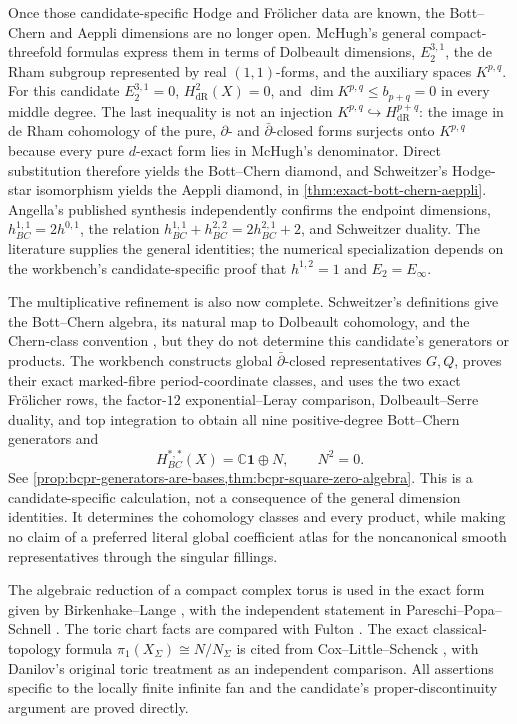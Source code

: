 Once those candidate-specific Hodge and Fr\"olicher data are known, the
Bott--Chern and Aeppli dimensions are no longer open.  McHugh's general
compact-threefold formulas
\cite[Theorem~6.3, Proposition~6.4, equation~(7), and \S7.1]{McHugh2019}
express them in terms
of Dolbeault dimensions, $E_2^{3,1}$, the de Rham subgroup represented by
real $(1,1)$-forms, and the auxiliary spaces $K^{p,q}$.  For this candidate
$E_2^{3,1}=0$, $H^2_{\mathrm{dR}}(X)=0$, and
$\dim K^{p,q}\le b_{p+q}=0$ in every middle degree.  The last inequality is
not an injection $K^{p,q}\hookrightarrow H^{p+q}_{\mathrm{dR}}$: the image in
de Rham cohomology of the pure, $\partial$- and $\bar\partial$-closed forms
surjects onto $K^{p,q}$ because every pure $d$-exact form lies in McHugh's
denominator.  Direct substitution therefore yields the Bott--Chern diamond,
and Schweitzer's Hodge-star isomorphism
\cite[\S2.c, pp.~9--10]{Schweitzer2007} yields the Aeppli diamond, in
\cref{thm:exact-bott-chern-aeppli}.  Angella's published synthesis
\cite[\S4]{Angella2018} independently confirms the endpoint dimensions,
$h^{1,1}_{BC}=2h^{0,1}$, the relation
$h^{1,1}_{BC}+h^{2,2}_{BC}=2h^{2,1}_{BC}+2$, and Schweitzer duality.  The
literature supplies the general identities; the numerical specialization
depends on the workbench's candidate-specific proof that $h^{1,2}=1$ and
$E_2=E_\infty$.

The multiplicative refinement is also now complete.  Schweitzer's
definitions give the Bott--Chern algebra, its natural map to Dolbeault
cohomology, and the Chern-class convention
\cite[\S2 and \S8.a]{Schweitzer2007}, but they do not determine this
candidate's generators or products.  The workbench constructs global
$\bar\partial$-closed representatives $G,Q$, proves their exact marked-fibre
period-coordinate classes, and uses the two exact Fr\"olicher rows, the
factor-$12$ exponential--Leray comparison, Dolbeault--Serre duality, and top
integration to obtain all nine positive-degree Bott--Chern generators and
\[
 H^{*,*}_{BC}(X)=\mathbb C\mathbf1\oplus N,
 \qquad N^2=0.
\]
See
\cref{prop:bcpr-generators-are-bases,thm:bcpr-square-zero-algebra}.  This is
a candidate-specific calculation, not a consequence of the general
dimension identities.  It determines the cohomology classes and every
product, while making no claim of a preferred literal global coefficient
atlas for the noncanonical smooth representatives through the singular
fillings.

The algebraic reduction of a compact complex torus is used in the exact form
given by Birkenhake--Lange \cite[Chapter~2, \S6]{BirkenhakeLange1999}, with
the independent statement in Pareschi--Popa--Schnell
\cite[\S8, p.~2437]{PareschiPopaSchnell2017}.  The toric chart facts are
compared with Fulton \cite{Fulton1993}.  The exact classical-topology formula
\(\pi_1(X_\Sigma)\cong N/N_\Sigma\) is cited from Cox--Little--Schenck
\cite[Theorem~12.1.10]{CoxLittleSchenck2011}, with Danilov's original toric
treatment \cite[\S9]{Danilov1978} as an independent comparison.  All
assertions specific to the locally finite infinite fan and the candidate's
proper-discontinuity argument are proved directly.

